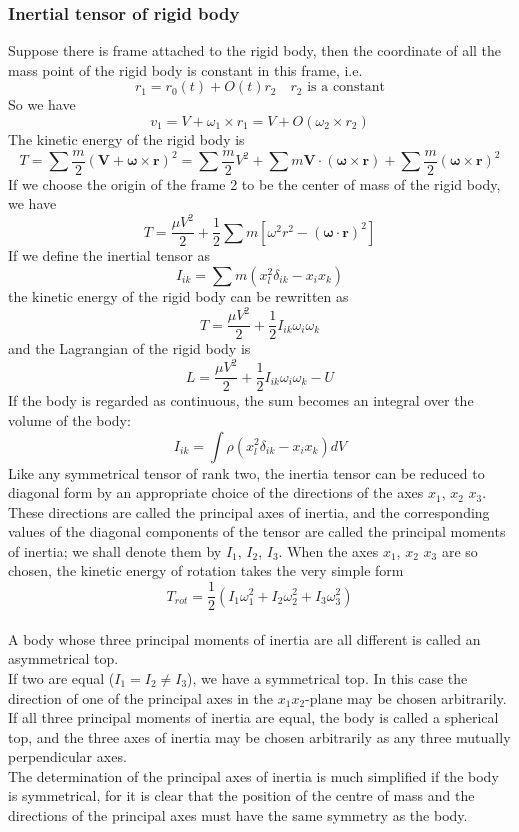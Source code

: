 \subsubsection{Inertial tensor of rigid body}
Suppose there is frame attached to the rigid body, then the coordinate of all the mass point of the rigid body is constant in this frame, i.e.
\[r_1 = r_0(t) + O(t)r_2 \quad r_2 \mbox{ is a constant}\]
So we have
\[v_1 = V + \omega_1 \times r_1 = V + O(\omega_2 \times r_2)\]
The kinetic energy of the rigid body is
\[T = \sum \frac{m}{2} (\bm{V} + \bm{\omega} \times \bm{r})^2 = \sum \frac{m}{2} V^2 + \sum m\bm{V}\cdot(\bm{\omega}\times\bm{r}) + \sum \frac{m}{2} (\bm{\omega} \times \bm{r})^2\]
If we choose the origin of the frame 2 to be the center of mass of the rigid body, we have
\[T = \frac{\mu V^2}{2} + \frac{1}{2}\sum m [\omega^2r^2-(\bm{\omega} \cdot \bm{r})^2]\]
If we define the inertial tensor as
\[I_{ik} = \sum m (x_l^2 \delta_{ik} - x_i x_k)\]
the kinetic energy of the rigid body can be rewritten as
\[T = \frac{\mu V^2}{2} + \frac{1}{2} I_{ik}\omega_i \omega_k\]
and the Lagrangian of the rigid body is
\[L = \frac{\mu V^2}{2} + \frac{1}{2} I_{ik}\omega_i \omega_k -U\]
If the body is regarded as continuous, the sum becomes an integral over the volume of the body:
\[I_{ik} = \int \rho (x_l^2 \delta_{ik} - x_i x_k) dV\]
Like any symmetrical tensor of rank two, the inertia tensor can be reduced to diagonal form by an appropriate choice of the directions of the axes $x_1$, $x_2$ $x_3$. 
These directions are called the principal axes of inertia, and the corresponding values of the diagonal components of the tensor are called the principal moments of inertia; we shall denote them by $I_1$, $I_2$, $I_3$. 
When the axes $x_1$, $x_2$ $x_3$ are so chosen, the kinetic energy of rotation takes the very simple form
\[T_{rot} = \frac{1}{2} (I_1 \omega_1^2 + I_2 \omega_2^2 + I_3 \omega_3^2)\]\\
A body whose three principal moments of inertia are all different is called an asymmetrical top. \\
If two are equal ($I_1 = I_2 \neq I_3$), we have a symmetrical top. 
In this case the direction of one of the principal axes in the $x_1x_2$-plane may be chosen arbitrarily. \\
If all three principal moments of inertia are equal, the body is called a spherical top, and the three axes of inertia may be chosen arbitrarily as any three mutually perpendicular axes.\\
The determination of the principal axes of inertia is much simplified if the body is symmetrical, for it is clear that the position of the centre of mass and the directions of the principal axes must have the same symmetry as the body. \\
